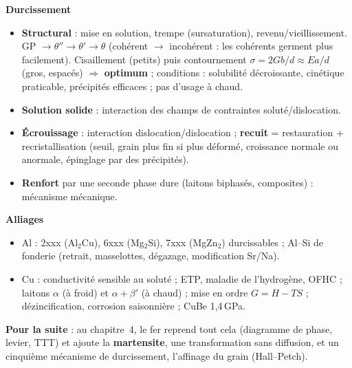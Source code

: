 \begin{recapbox}
\textbf{Durcissement}
\begin{itemize}
  \item \textbf{Structural} : mise en solution, trempe (sursaturation), revenu/vieillissement.
        GP $\to \theta'' \to \theta' \to \theta$ (cohérent $\to$ incohérent : les cohérents
        germent plus facilement). Cisaillement (petits) puis contournement
        \textbf{$\sigma = 2Gb/d \approx Ea/d$} (gros, espacés) $\Rightarrow$ \textbf{optimum} ;
        conditions : solubilité décroissante, cinétique praticable, précipités efficaces ;
        pas d'usage à chaud.
  \item \textbf{Solution solide} : interaction des champs de contraintes soluté/dislocation.
  \item \textbf{Écrouissage} : interaction dislocation/dislocation ; \textbf{recuit} =
        restauration + recristallisation (seuil, grain plus fin si plus déformé, croissance
        normale ou anormale, épinglage par des précipités).
  \item \textbf{Renfort} par une seconde phase dure (laitons biphasés, composites) :
        mécanisme mécanique.
\end{itemize}

\textbf{Alliages}
\begin{itemize}
  \item Al : 2xxx (Al$_2$Cu), 6xxx (Mg$_2$Si), 7xxx (MgZn$_2$) durcissables ; Al--Si de
        fonderie (retrait, masselottes, dégazage, modification Sr/Na).
  \item Cu : conductivité sensible au soluté ; ETP, maladie de l'hydrogène, OFHC ; laitons
        $\alpha$ (à froid) et $\alpha + \beta'$ (à chaud) ; mise en ordre $G = H - TS$ ;
        dézincification, corrosion saisonnière ; CuBe 1,4\,GPa.
\end{itemize}

\textbf{Pour la suite} : au chapitre~4, le fer reprend tout cela (diagramme de phase, levier,
TTT) et ajoute la \textbf{martensite}, une transformation sans diffusion, et un cinquième
mécanisme de durcissement, l'affinage du grain (Hall--Petch).
\end{recapbox}
